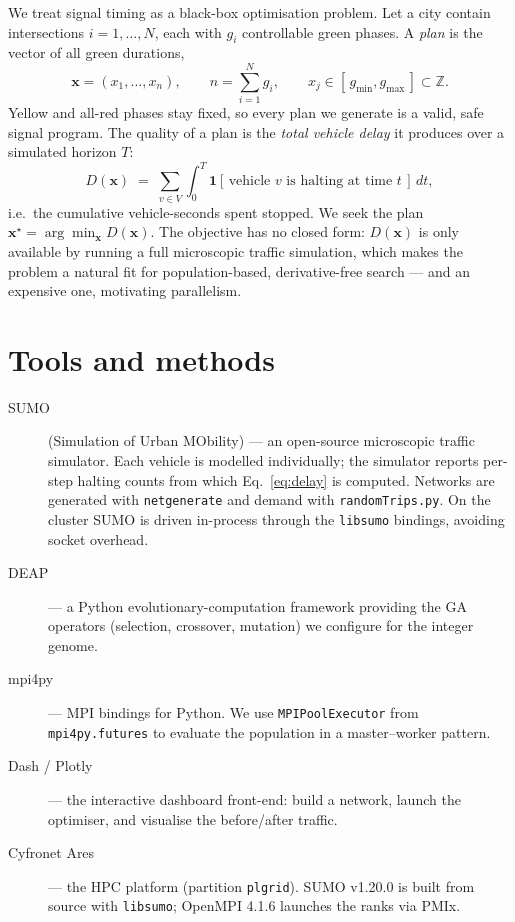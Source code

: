 \documentclass[11pt,a4paper]{article}
\begin{document}
We treat signal timing as a black-box optimisation problem. Let a city contain
intersections $i=1,\dots,N$, each with $g_i$ controllable green phases. A
\emph{plan} is the vector of all green durations,
\[
  \mathbf{x} = (x_1,\dots,x_n), \qquad n = \sum_{i=1}^{N} g_i,
  \qquad x_j \in [\,g_{\min}, g_{\max}\,] \subset \mathbb{Z}.
\]
Yellow and all-red phases stay fixed, so every plan we generate is a valid,
safe signal program. The quality of a plan is the \emph{total vehicle delay}
it produces over a simulated horizon $T$:
\begin{equation}
  D(\mathbf{x}) \;=\; \sum_{v \in V} \int_{0}^{T}
     \mathbf{1}\!\left[\,\text{vehicle } v \text{ is halting at time } t\,\right]\,dt,
  \label{eq:delay}
\end{equation}
i.e.\ the cumulative vehicle-seconds spent stopped. We seek the plan
$\mathbf{x}^\star = \arg\min_{\mathbf{x}} D(\mathbf{x})$. The objective has no
closed form: $D(\mathbf{x})$ is only available by running a full microscopic
traffic simulation, which makes the problem a natural fit for population-based,
derivative-free search --- and an expensive one, motivating parallelism.

\section{Tools and methods}
\begin{description}
  \item[SUMO] (Simulation of Urban MObility) --- an open-source microscopic
  traffic simulator. Each vehicle is modelled individually; the simulator
  reports per-step halting counts from which Eq.~\eqref{eq:delay} is computed.
  Networks are generated with \texttt{netgenerate} and demand with
  \texttt{randomTrips.py}. On the cluster SUMO is driven in-process through the
  \texttt{libsumo} bindings, avoiding socket overhead.
  \item[DEAP] --- a Python evolutionary-computation framework providing the GA
  operators (selection, crossover, mutation) we configure for the integer
  genome.
  \item[mpi4py] --- MPI bindings for Python. We use
  \texttt{MPIPoolExecutor} from \texttt{mpi4py.futures} to evaluate the
  population in a master--worker pattern.
  \item[Dash / Plotly] --- the interactive dashboard front-end: build a
  network, launch the optimiser, and visualise the before/after traffic.
  \item[Cyfronet Ares] --- the HPC platform (partition \texttt{plgrid}). SUMO
  v1.20.0 is built from source with \texttt{libsumo}; OpenMPI 4.1.6 launches the
  ranks via PMIx.
\end{description}
\end{document}
